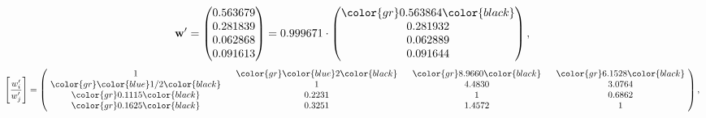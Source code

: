 \begin{example}
\begin{equation*}
\mathbf{w}^{\prime} =
\begin{pmatrix}
0.563679\\
0.281839\\
0.062868\\
0.091613
\end{pmatrix} =
0.999671\cdot
\begin{pmatrix}
\color{gr} 0.563864\color{black} \\
0.281932\\
0.062889\\
0.091644
\end{pmatrix},
\end{equation*}
\begin{equation*}
\left[ \frac{{w}^{\prime}_i}{{w}^{\prime}_j} \right] =
\begin{pmatrix}
$\,\,$ 1 $\,\,$ & $\,\,$\color{gr} \color{blue} 2\color{black} $\,\,$ & $\,\,$\color{gr} 8.9660\color{black} $\,\,$ & $\,\,$\color{gr} 6.1528\color{black} $\,\,$ \\
$\,\,$\color{gr} \color{blue}  1/2\color{black} $\,\,$ & $\,\,$ 1 $\,\,$ & $\,\,$4.4830$\,\,$ & $\,\,$3.0764  $\,\,$ \\
$\,\,$\color{gr} 0.1115\color{black} $\,\,$ & $\,\,$0.2231$\,\,$ & $\,\,$ 1 $\,\,$ & $\,\,$0.6862 $\,\,$ \\
$\,\,$\color{gr} 0.1625\color{black} $\,\,$ & $\,\,$0.3251$\,\,$ & $\,\,$1.4572$\,\,$ & $\,\,$ 1  $\,\,$ \\
\end{pmatrix},
\end{equation*}
\end{example}
\newpage
